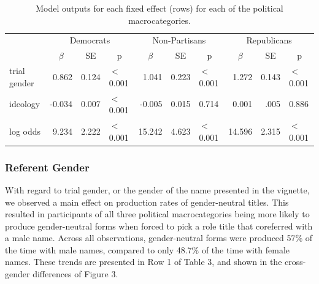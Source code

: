 \documentclass[10pt,letterpaper]{article}
\begin{document}
	\begin{table}[t!]
		\centering
		\caption{Model outputs for each fixed effect (rows) for each of the political macrocategories.}
		\vskip 0.12in
		\begin{tabular}{l r r l r r l r r l }
					\toprule
					& \multicolumn{3}{c}{Democrats} & \multicolumn{3}{c}{Non-Partisans} & \multicolumn{3}{c}{Republicans} \\ \cmidrule(r){2-4} \cmidrule(r){5-7} \cmidrule(r){8-10}
					& \multicolumn{1}{c}{$\beta$} & \multicolumn{1}{c}{SE} & \multicolumn{1}{c}{p} & \multicolumn{1}{c}{$\beta$} & \multicolumn{1}{c}{SE} & \multicolumn{1}{c}{p} & \multicolumn{1}{c}{$\beta$} & \multicolumn{1}{c}{SE} & \multicolumn{1}{c}{p}\\ 
					\midrule
					trial gender   & 0.862 & 0.124 & \cellcolor{lightgray} $<$0.001        & 1.041 & 0.223 & \cellcolor{lightgray} $<$0.001 & 1.272  & 0.143 &  \cellcolor{lightgray} $<$0.001\\
					ideology & -0.034  & 0.007 & \cellcolor{lightgray} $<$0.001            & -0.005 & 0.015& 0.714           & 0.001  & .005 & 0.886 \\
					log odds & 9.234 & 2.222  &  \cellcolor{lightgray} $<$0.001            & 15.242 & 4.623 & \cellcolor{lightgray} $<$0.001     & 14.596  & 2.315 & \cellcolor{lightgray} $<$0.001\\
					\bottomrule
				\end{tabular}
				\label{tab:exp2results}
			\end{table}
		
	\subsubsection{Referent Gender} With regard to trial gender, or the gender of the name presented in the vignette, we observed a main effect on production rates of gender-neutral titles. This resulted in participants of all three political macrocategories being more likely to produce gender-neutral forms when forced to pick a role title that coreferred with a male name. Across all observations, gender-neutral forms were produced 57\% of the time with male names, compared to only 48.7\% of the time with female names. These trends are presented in Row 1 of Table 3, and shown in the cross-gender differences of Figure 3.
	
\end{document}
